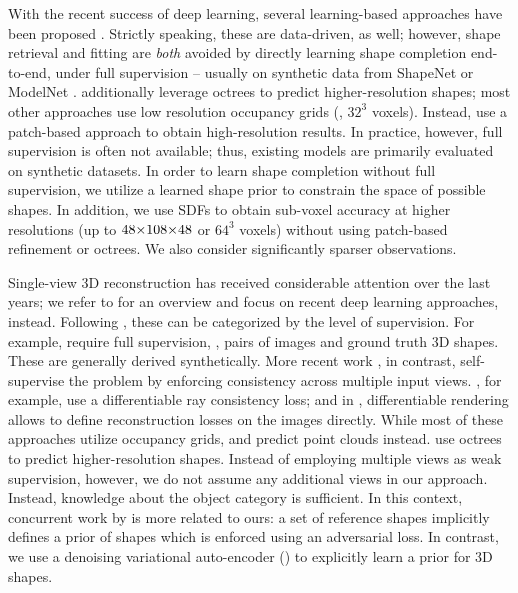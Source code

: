 With the recent success of deep learning, several learning-based approaches have been proposed \citep{Firman2016CVPR,Smith2017ARXIV,Dai2017CVPRa,Sharma2016ARXIV,Rezende2016ARXIV,Fan2017CVPR,Riegler2017THREEDV,Han2017ICCV,Yang2017ARXIV,Yang2018ARXIVb}. Strictly speaking, these are data-driven, as well; however, shape retrieval and fitting are \emph{both} avoided by directly learning shape completion end-to-end, under full supervision -- usually on synthetic data from ShapeNet \citep{Chang2015ARXIV} or ModelNet \citep{Wu2015CVPR}. \cite{Riegler2017THREEDV} additionally leverage octrees to predict higher-resolution shapes; most other approaches use low resolution occupancy grids (\eg, $32^3$ voxels). Instead, \cite{Han2017ICCV} use a patch-based approach to obtain high-resolution results. In practice, however, full supervision is often not available; thus, existing models are primarily evaluated on synthetic datasets. In order to learn shape completion without full supervision, we utilize a learned shape prior to constrain the space of possible shapes. In addition, we use SDFs to obtain sub-voxel accuracy at higher resolutions (up to $48 \operatorname*{\!\times\!} 108 \operatorname*{\!\times\!} 48$ or $64^3$ voxels) without using patch-based refinement or octrees. We also consider significantly sparser observations.

%
Single-view 3D reconstruction has received considerable attention over the last years; we refer to \citep{Oswal2013ISAMA} for an overview and focus on recent deep learning approaches, instead. Following \cite{Tulsiani2018ARXIV}, these can be categorized by the level of supervision. For example, \citep{Girdhar2016ECCV,Choy2016ECCV,Wu2016NIPS,Haene2017ARXIV} require full supervision, \ie, pairs of images and ground truth 3D shapes. These are generally derived synthetically. More recent work \citep{Yan2016NIPS,Tulsiani2017CVPR,Tulsiani2018ARXIV,Kato2017ARXIV,Lin2017ARXIV,Fan2017CVPR,Tatarchenko2017ICCV,Wu2016ECCV}, in contrast, self-supervise the problem by enforcing consistency across multiple input views. \cite{Tulsiani2018ARXIV}, for example, use a differentiable ray consistency loss; and in \citep{Yan2016NIPS,Kato2017ARXIV,Lin2017ARXIV}, differentiable rendering allows to define reconstruction losses on the images directly. While most of these approaches utilize occupancy grids, \cite{Fan2017CVPR} and \cite{Lin2017ARXIV} predict point clouds instead. \cite{Tatarchenko2017ICCV} use octrees to predict higher-resolution shapes. Instead of employing multiple views as weak supervision, however, we do not assume any additional views in our approach. Instead, knowledge about the object category is sufficient. In this context, concurrent work by \cite{Gwak2017ARXIV} is more related to ours: a set of reference shapes implicitly defines a prior of shapes which is enforced using an adversarial loss. In contrast, we use a denoising variational auto-encoder (\DVAE) \citep{Kingma2014ICLR,Im2017AAAI} to explicitly learn a prior for 3D shapes.

